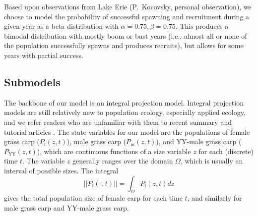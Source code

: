 \documentclass{article}[12pt]
\begin{document}
Based upon observations from Lake Erie (P.~Kocovsky, personal observation), we choose to model the probability of successful spawning and recruitment during a given year as a beta distribution with \(\alpha = 0.75, \beta=0.75\). 
This produces a bimodal distribution with mostly boom or bust years (i.e., almost all or none of the population successfully spawns and produces recruits), but allows for some years with partial success. 


\subsection{Submodels}\label{sec:submdl}

The backbone of our model is an integral projection model.
Integral projection models are still relatively new to population ecology, especially applied ecology, and we refer readers who are unfamiliar with them to recent summary and tutorial articles \citep[e.g.,][]{ellner2006integral, ramula2009integral, merow2014advancing}. The state variables for our model are the populations of female grass carp (\(P_\text{f}(z,t)\)), male grass carp (\(P_\text{m}(z, t)\)), and YY-male grass carp (\(P_\text{YY}(z, t)\)), which are continuous functions of a size variable \(z\) for each (discrete) time \(t\).  The variable \(z\) generally ranges over the domain \(\Omega\), which is usually an interval of possible sizes.  The integral
\begin{equation*}
||P_{\text{f}}(\cdot, t)|| = \int_{\Omega}P_{\text{f}}(z, t) dz
\end{equation*}
gives the total population size of female carp for each time \(t\), and similarly for male grass carp and YY-male grass carp. 
\end{document}
